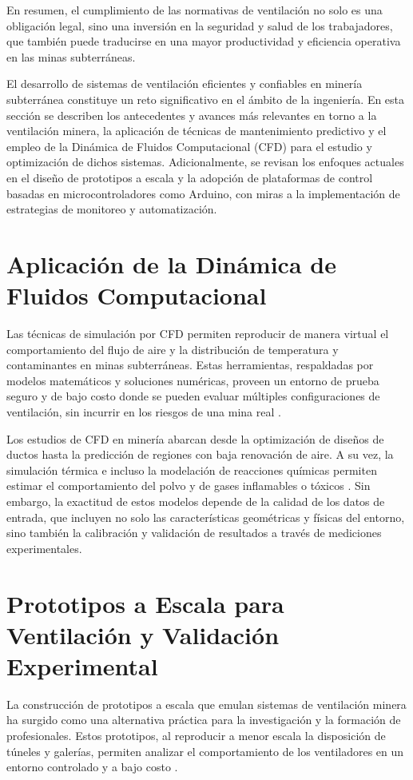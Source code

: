 En resumen, el cumplimiento de las normativas de ventilación no solo es una obligación legal, sino una inversión en la seguridad y salud de los trabajadores, que también puede traducirse en una mayor productividad y eficiencia operativa en las minas subterráneas.

El desarrollo de sistemas de ventilación eficientes y confiables en minería subterránea constituye un reto significativo en el ámbito de la ingeniería. En esta sección se describen los antecedentes y avances más relevantes en torno a la ventilación minera, la aplicación de técnicas de mantenimiento predictivo y el empleo de la Dinámica de Fluidos Computacional (CFD) para el estudio y optimización de dichos sistemas. Adicionalmente, se revisan los enfoques actuales en el diseño de prototipos a escala y la adopción de plataformas de control basadas en microcontroladores como Arduino, con miras a la implementación de estrategias de monitoreo y automatización.

\section{Aplicación de la Dinámica de Fluidos Computacional}
Las técnicas de simulación por CFD permiten reproducir de manera virtual el comportamiento del flujo de aire y la distribución de temperatura y contaminantes en minas subterráneas. Estas herramientas, respaldadas por modelos matemáticos y soluciones numéricas, proveen un entorno de prueba seguro y de bajo costo donde se pueden evaluar múltiples configuraciones de ventilación, sin incurrir en los riesgos de una mina real \cite{ANSYS2021, OpenFOAM2020}.

Los estudios de CFD en minería abarcan desde la optimización de diseños de ductos hasta la predicción de regiones con baja renovación de aire. A su vez, la simulación térmica e incluso la modelación de reacciones químicas permiten estimar el comportamiento del polvo y de gases inflamables o tóxicos \cite{Vutukuri2017}. Sin embargo, la exactitud de estos modelos depende de la calidad de los datos de entrada, que incluyen no solo las características geométricas y físicas del entorno, sino también la calibración y validación de resultados a través de mediciones experimentales.

\section{Prototipos a Escala para Ventilación y Validación Experimental}
La construcción de prototipos a escala que emulan sistemas de ventilación minera ha surgido como una alternativa práctica para la investigación y la formación de profesionales. Estos prototipos, al reproducir a menor escala la disposición de túneles y galerías, permiten analizar el comportamiento de los ventiladores en un entorno controlado y a bajo costo \cite{Zhou2020}. 

